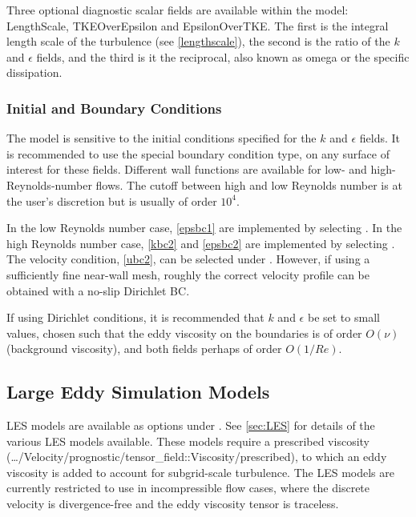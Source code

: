Three optional diagnostic scalar fields are available within the model: LengthScale, TKEOverEpsilon and EpsilonOverTKE. The first is the integral length scale of the turbulence (see \eqref{lengthscale}), the second is the ratio of the $k$ and $\epsilon$ fields, and the third is it the reciprocal, also known as omega or the specific dissipation.

\subsubsection{Initial and Boundary Conditions}

The model is sensitive to the initial conditions specified for the $k$ and $\epsilon$ fields. It is recommended to use the special boundary condition type,  on any surface of interest for these fields. Different wall functions are available for low- and high-Reynolds-number flows. The cutoff between high and low Reynolds number is at the user's discretion but is usually of order $10^4$.

In the low Reynolds number case, \eqref{epsbc1} are implemented by selecting . In the high Reynolds number case, \eqref{kbc2} and \eqref{epsbc2} are implemented by selecting . The velocity condition, \eqref{ubc2}, can be selected under \linebreak
{}.
However, if using a sufficiently fine near-wall mesh, roughly the correct velocity profile can be obtained with a no-slip Dirichlet BC.

If using Dirichlet conditions, it is recommended that $k$ and $\epsilon$ be set to small values, chosen such that the eddy viscosity on the boundaries is of order $O(\nu)$ (background viscosity), and both fields perhaps of order $O(1/Re)$.

\subsection{Large Eddy Simulation Models}

LES models are available as options under . See \ref{sec:LES} for details of the various LES models available. These models require a prescribed viscosity (\ldots/Velocity/prognostic/tensor\_field::Viscosity/prescribed), to which an eddy viscosity is added to account for subgrid-scale turbulence. The LES models are currently restricted to use in incompressible flow cases, where the discrete velocity is divergence-free and the eddy viscosity tensor is traceless.


